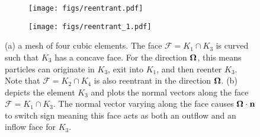 \documentclass[../doc.tex]{subfiles}
\begin{document}
\begin{figure}
\centering
\begin{subfigure}{.49\textwidth}
	\centering
	\texttt{[image: figs/reentrant.pdf]}
	\caption{}
	\label{sn:reentrant_mesh}
\end{subfigure}
\begin{subfigure}{.49\textwidth}
	\centering
	\texttt{[image: figs/reentrant\_1.pdf]}
	\caption{}
	\label{sn:reentrant_zoom}
\end{subfigure}
\caption{(a) a mesh of four cubic elements. The face $\mathcal{F} = K_1 \cap K_3$ is curved such that $K_3$ has a concave face. For the direction $\boldsymbol{\Omega}$, this means particles can originate in $K_3$, exit into $K_1$, and then reenter $K_3$. Note that $\mathcal{F} = K_2 \cap K_4$ is also reentrant in the direction $\boldsymbol{\Omega}$. (b) depicts the element $K_3$ and plots the normal vectors along the face $\mathcal{F} = K_1 \cap K_3$. The normal vector varying along the face causes $\boldsymbol{\Omega}\cdot\boldsymbol{\mathrm{n}}$ to switch sign meaning this face acts as both an outflow and an inflow face for $K_3$. }
\label{sn:reentrant_diag}
\end{figure}
\end{document}

